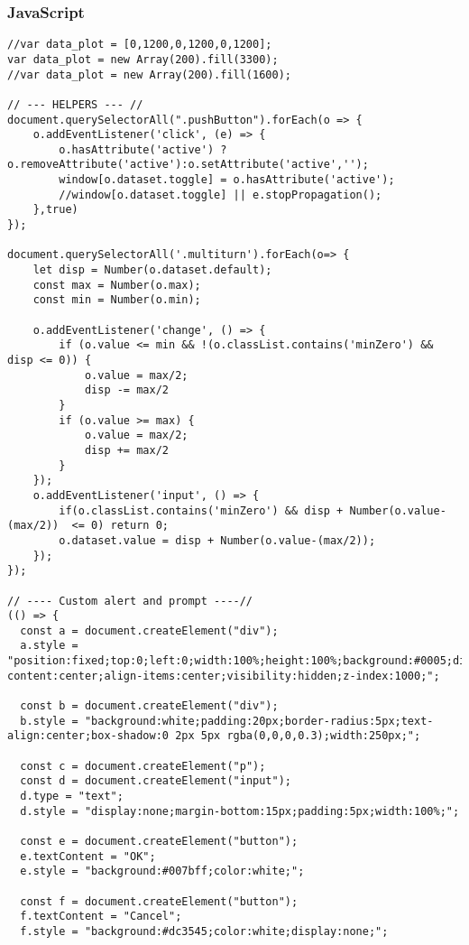 \subsubsection*{JavaScript}
\begin{lstlisting}[style=htmlcssjs]
//var data_plot = [0,1200,0,1200,0,1200];
var data_plot = new Array(200).fill(3300);
//var data_plot = new Array(200).fill(1600);

// --- HELPERS --- //
document.querySelectorAll(".pushButton").forEach(o => {
    o.addEventListener('click', (e) => {
        o.hasAttribute('active') ? o.removeAttribute('active'):o.setAttribute('active','');
        window[o.dataset.toggle] = o.hasAttribute('active');
        //window[o.dataset.toggle] || e.stopPropagation();
    },true)
});

document.querySelectorAll('.multiturn').forEach(o=> {
    let disp = Number(o.dataset.default);
    const max = Number(o.max);
    const min = Number(o.min);

    o.addEventListener('change', () => {
        if (o.value <= min && !(o.classList.contains('minZero') && disp <= 0)) {
            o.value = max/2;
            disp -= max/2
        }
        if (o.value >= max) {
            o.value = max/2;
            disp += max/2
        }
    });
    o.addEventListener('input', () => {
        if(o.classList.contains('minZero') && disp + Number(o.value-(max/2))  <= 0) return 0;
        o.dataset.value = disp + Number(o.value-(max/2));
    });
});

// ---- Custom alert and prompt ----//
(() => {
  const a = document.createElement("div");
  a.style = "position:fixed;top:0;left:0;width:100%;height:100%;background:#0005;display:flex;justify-content:center;align-items:center;visibility:hidden;z-index:1000;";

  const b = document.createElement("div");
  b.style = "background:white;padding:20px;border-radius:5px;text-align:center;box-shadow:0 2px 5px rgba(0,0,0,0.3);width:250px;";

  const c = document.createElement("p");
  const d = document.createElement("input");
  d.type = "text";
  d.style = "display:none;margin-bottom:15px;padding:5px;width:100%;";

  const e = document.createElement("button");
  e.textContent = "OK";
  e.style = "background:#007bff;color:white;";

  const f = document.createElement("button");
  f.textContent = "Cancel";
  f.style = "background:#dc3545;color:white;display:none;";


\end{lstlisting}

